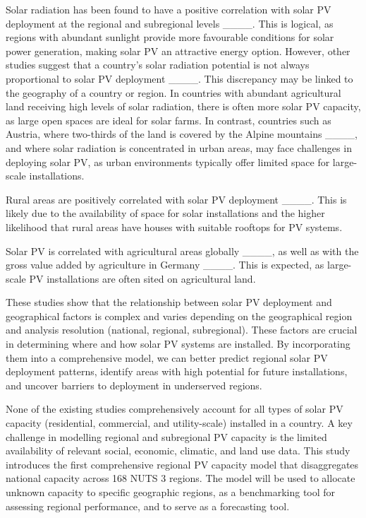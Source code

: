 Solar radiation has been found to have a positive correlation with solar PV deployment at the regional and subregional levels ____. This is logical, as regions with abundant sunlight provide more favourable conditions for solar power generation, making solar PV an attractive energy option. However, other studies suggest that a country's solar radiation potential is not always proportional to solar PV deployment ____. This discrepancy may be linked to the geography of a country or region. In countries with abundant agricultural land receiving high levels of solar radiation, there is often more solar PV capacity, as large open spaces are ideal for solar farms. In contrast, countries such as Austria, where two-thirds of the land is covered by the Alpine mountains ____, and where solar radiation is concentrated in urban areas, may face challenges in deploying solar PV, as urban environments typically offer limited space for large-scale installations. 




Rural areas are positively correlated with solar PV deployment ____. This is likely due to the availability of space for solar installations and the higher likelihood that rural areas have houses with suitable rooftops for PV systems. 

Solar PV is correlated with agricultural areas globally ____, as well as with the gross value added by agriculture in Germany ____. This is expected, as large-scale PV installations are often sited on agricultural land.

These studies show that the relationship between solar PV deployment and geographical factors is complex and varies depending on the geographical region and analysis resolution (national, regional, subregional). These factors are crucial in determining where and how solar PV systems are installed. By incorporating them into a comprehensive model, we can better predict regional solar PV deployment patterns, identify areas with high potential for future installations, and uncover barriers to deployment in underserved regions.

None of the existing studies comprehensively account for all types of solar PV capacity (residential, commercial, and utility-scale) installed in a country. A key challenge in modelling regional and subregional PV capacity is the limited availability of relevant social, economic, climatic, and land use data. This study introduces the first comprehensive regional PV capacity model that disaggregates national capacity across 168 NUTS 3 regions. The model will be used to allocate unknown capacity to specific geographic regions, as a benchmarking tool for assessing regional performance, and to serve as a forecasting tool. 






